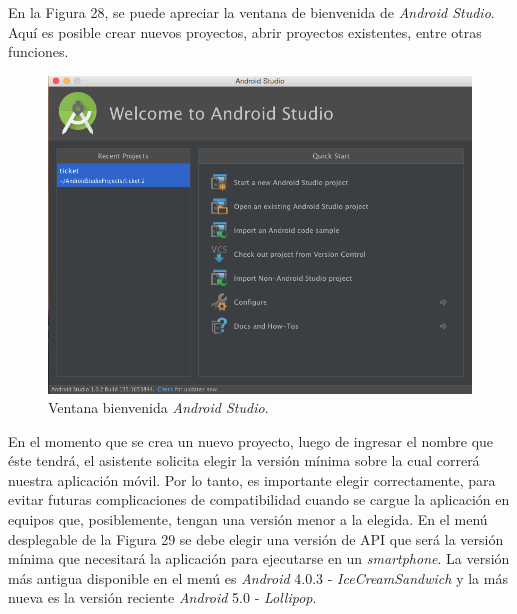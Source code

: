 En la Figura 28, se puede apreciar la ventana de bienvenida de \textit{Android Studio}. Aquí es posible crear nuevos proyectos, abrir proyectos existentes, entre otras funciones.\\

\begin{figure}[H]
\centering
\includegraphics[scale=0.40]{images/capitulo5/androidStudio.png}
\caption{Ventana bienvenida \textit{Android Studio}.}
\label{androidStudio}
\end{figure}

En el momento que se crea un nuevo proyecto, luego de ingresar el nombre que éste tendrá, el asistente solicita elegir la versión mínima sobre la cual correrá nuestra aplicación móvil. Por lo tanto, es importante elegir correctamente, para evitar futuras complicaciones de compatibilidad cuando se cargue la aplicación en equipos que, posiblemente, tengan una versión menor a la elegida. En el menú desplegable de la Figura 29 se debe elegir una versión de API que será la versión mínima que necesitará la aplicación para ejecutarse en un \textit{smartphone}. La versión más antigua disponible en el menú es \textit{Android} 4.0.3 - \textit{IceCreamSandwich} y la más nueva es la versión reciente \textit{Android} 5.0 - \textit{Lollipop}.\\

